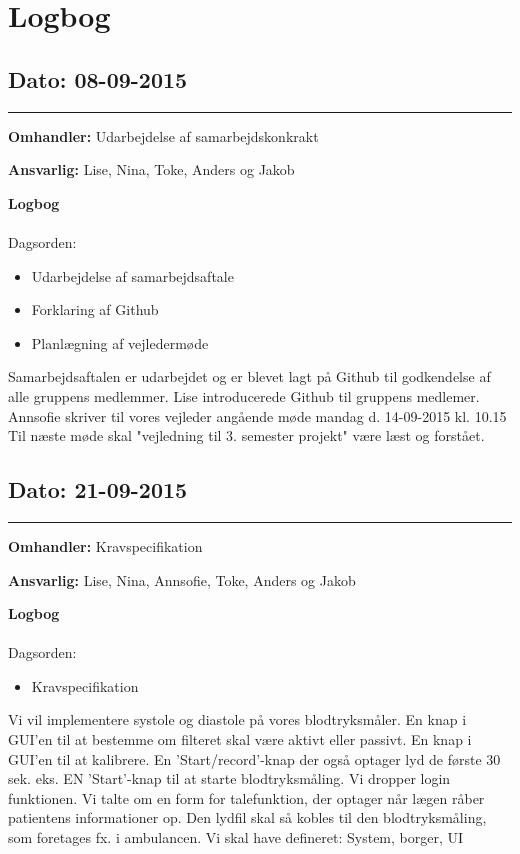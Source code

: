 \chapter{Logbog}

\section{Dato: 08-09-2015 }
\hrule

\textbf{Omhandler:} Udarbejdelse af samarbejdskonkrakt 

\textbf{Ansvarlig:} Lise, Nina, Toke, Anders og Jakob

\textbf{Logbog}
\\
\\
Dagsorden:
\begin{itemize}
	\item Udarbejdelse af samarbejdsaftale
	\item Forklaring af Github
	\item Planlægning af vejledermøde
\end{itemize}

Samarbejdsaftalen er udarbejdet og er blevet lagt på Github til godkendelse af alle gruppens medlemmer.\newline 
Lise introducerede Github til gruppens medlemer.\newline 
Annsofie skriver til vores vejleder angående møde mandag d. 14-09-2015 kl. 10.15\newline 
Til næste møde skal "vejledning til 3. semester projekt" være læst og forstået.\newline





\section{Dato: 21-09-2015 }
\hrule

\textbf{Omhandler:} Kravspecifikation

\textbf{Ansvarlig:} Lise, Nina, Annsofie, Toke, Anders og Jakob

\textbf{Logbog}
\\
\\
Dagsorden:
\begin{itemize}
	\item Kravspecifikation

\end{itemize}

Vi vil implementere systole og diastole på vores blodtryksmåler.
En knap i GUI'en til at bestemme om filteret skal være aktivt eller passivt.
En knap i GUI'en til at kalibrere.
En 'Start/record'-knap der også optager lyd de første 30 sek. eks.
EN 'Start'-knap til at starte blodtryksmåling.
Vi dropper login funktionen.
Vi talte om en form for talefunktion, der optager når lægen råber patientens informationer op. Den lydfil skal så kobles til den blodtryksmåling, som foretages fx. i ambulancen. 
Vi skal have defineret: System, borger, UI


